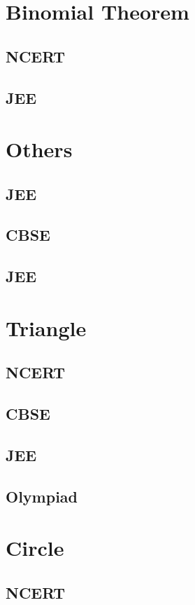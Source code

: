 \documentclass[journal]{IEEEtran}
\begin{document}
\section{Binomial Theorem}
\subsection{NCERT}

\subsection{JEE}

%
\section{Others}
\subsection{JEE}
%

\subsection{CBSE}

\subsection{JEE}

%
\section{Triangle}
\subsection{NCERT}

\subsection{CBSE}

\subsection{JEE}
 
\subsection{Olympiad}

\section{Circle}
\subsection{NCERT}

\end{document}
